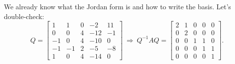 \documentclass[11pt]{article}
\newcommand{\1}{\mathbf{1}}
\newcommand{\0}{\mathbf{0}}
\theoremstyle{definition}
\begin{document}
We already know what the Jordan form is and how to write the basis.
Let's double-check:
\[
Q=
\left[\begin{matrix}1 & 1 & 0 & -2 & 11\\0 & 0 & 4 & -12 & -1\\-1 & 0 & 4 & -10 & 0\\-1 & -1 & 2 & -5 & -8\\1 & 0 & 4 & -14 & 0\end{matrix}\right]
\
\Longrightarrow
\
Q^{-1}AQ = 
\left[\begin{array}{rr|rrr}2 & 1 & 0 & 0 & 0\\0 & 2 & 0 & 0 & 0\\\hline 0 & 0 & 1 & 1 & 0\\0 & 0 & 0 & 1 & 1\\0 & 0 & 0 & 0 & 1\end{array}\right]
.
\]
\end{document}
